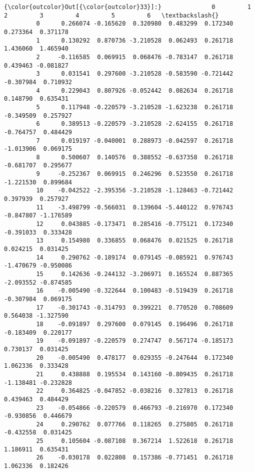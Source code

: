 \documentclass[11pt]{article}
\begin{document}
\begin{Verbatim}[commandchars=\\\{\}]
{\color{outcolor}Out[{\color{outcolor}33}]:}              0         1         2         3         4         5         6   \textbackslash{}
         0      0.266074 -0.165620  0.320980  0.483299  0.172340  0.273364  0.371178   
         1      0.130292  0.870736 -3.210528  0.062493  0.261718  1.436060  1.465940   
         2     -0.116585  0.069915  0.068476 -0.783147  0.261718  0.439463 -0.081827   
         3      0.031541  0.297600 -3.210528 -0.583590 -0.721442 -0.307984  0.710932   
         4      0.229043  0.807926 -0.052442  0.082634  0.261718  0.148790  0.635431   
         5      0.117948 -0.220579 -3.210528 -1.623238  0.261718 -0.349509  0.257927   
         6      0.389513 -0.220579 -3.210528 -2.624155  0.261718 -0.764757  0.484429   
         7      0.019197 -0.040001  0.288973 -0.042597  0.261718 -1.013906  0.069175   
         8      0.500607  0.140576  0.388552 -0.637358  0.261718 -0.681707  0.295677   
         9     -0.252367  0.069915  0.246296  0.523550  0.261718 -1.221530  0.899684   
         10    -0.042522 -2.395356 -3.210528 -1.128463 -0.721442  0.397939  0.257927   
         11    -3.498799 -0.566031  0.139604 -5.440122  0.976743 -0.847807 -1.176589   
         12     0.043885 -0.173471  0.285416 -0.775121  0.172340 -0.391033  0.333428   
         13     0.154980  0.336855  0.068476  0.021525  0.261718  0.024215  0.031425   
         14     0.290762 -0.189174  0.079145 -0.085921  0.976743 -1.470679 -0.950086   
         15     0.142636 -0.244132 -3.206971  0.165524  0.887365 -2.093552 -0.874585   
         16    -0.005490 -0.322644  0.100483 -0.519439  0.261718 -0.307984  0.069175   
         17    -0.301743 -0.314793  0.399221  0.770520  0.708609  0.564038 -1.327590   
         18    -0.091897  0.297600  0.079145  0.196496  0.261718 -0.183409  0.220177   
         19    -0.091897 -0.220579  0.274747  0.567174 -0.185173  0.730137  0.031425   
         20    -0.005490  0.478177  0.029355 -0.247644  0.172340  1.062336  0.333428   
         21     0.438888  0.195534  0.143160 -0.809435  0.261718 -1.138481 -0.232828   
         22     0.364825 -0.047852 -0.038216  0.327813  0.261718  0.439463  0.484429   
         23    -0.054866 -0.220579  0.466793 -0.216970  0.172340 -0.930856  0.446679   
         24     0.290762  0.077766  0.118265  0.275805  0.261718 -0.432558  0.031425   
         25     0.105604 -0.087108  0.367214  1.522618  0.261718  1.186911  0.635431   
         26    -0.030178  0.022808  0.157386 -0.771451  0.261718  1.062336  0.182426   

\end{Verbatim}
\end{document}

